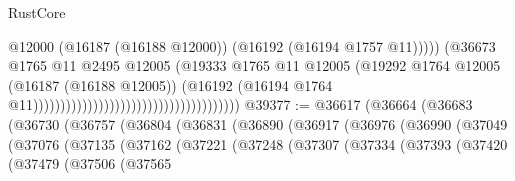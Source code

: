 \begin{lexlean}{RustCore}
\begin{coremodule}
                                                                            @12000
                                                                            (@16187 (@16188 @12000))
                                                                            (@16192
                                                                              (@16194 @1757 @11)))))
                                                                      (@36673
                                                                        @1765
                                                                        @11
                                                                        @2495
                                                                        @12005
                                                                        (@19333
                                                                          @1765
                                                                          @11
                                                                          @12005
                                                                          (@19292
                                                                            @1764
                                                                            @12005
                                                                            (@16187 (@16188 @12005))
                                                                            (@16192
                                                                              (@16194
                                                                                @1764
                                                                                @11))))))))))))))))))))))))))))))))))))))
@39377 := @36617
    (@36664
      (@36683
        (@36730
          (@36757
            (@36804
              (@36831
                (@36890
                  (@36917
                    (@36976
                      (@36990
                        (@37049
                          (@37076
                            (@37135
                              (@37162
                                (@37221
                                  (@37248
                                    (@37307
                                      (@37334
                                        (@37393
                                          (@37420
                                            (@37479
                                              (@37506
                                                (@37565

\end{coremodule}
\end{lexlean}
